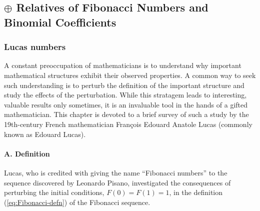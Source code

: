 


\subsection{$\oplus$ Relatives of Fibonacci Numbers and Binomial Coefficients}
\label{sec:Fibo-relatives}

\subsubsection{Lucas numbers}
\label{sec:Lucas-numbers}

A constant preoccupation of mathematicians is to understand why
important mathematical structures exhibit their observed properties.
A common way to seek such understanding is to perturb the definition
of the important structure and study the effects of the perturbation.
While this stratagem leads to interesting, valuable results only
sometimes, it is an invaluable tool in the hands of a gifted
mathematician.  This chapter is devoted to a brief survey of such a
study by the 19th-century French mathematician Fran\c{c}ois Edouard
Anatole Lucas (commonly known as Edouard Lucas).

\paragraph{\small\sf A. Definition}

Lucas, who is credited with giving the name ``Fibonacci numbers'' to
the sequence discovered by Leonardo Pisano,
investigated the consequences of perturbing the initial conditions,
$F(0) = F(1) = 1$, in the definition (\ref{eq:Fibonacci-defn}) of the
Fibonacci sequence.

